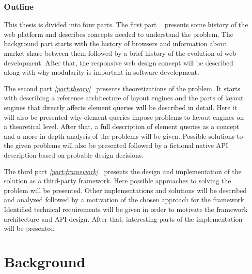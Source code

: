\documentclass[a4paper,11pt]{kth-mag}
\begin{document}
    \section{Outline}
      This thesis is divided into four parts. The first part \emph{\ref{part:background}~} presents some history of the \gls{web} platform and describes concepts needed to understand the problem.
      The background part starts with the history of \glspl{browser} and information about market share between them followed by a brief history of the evolution of \gls{web} development.
      After that, the \gls{responsive} \gls{web} design concept will be described along with why modularity is important in software development.

      The second part \emph{\ref{part:theory}~} presents theoretizations of the problem.
      It starts with describing a reference architecture of \glspl{layout engine} and the parts of \glspl{layout engine} that directly affects element queries will be described in detail.
      Here it will also be presented why element queries impose problems to \glspl{layout engine} on a theoretical level.
      After that, a full description of element queries as a concept and a more in depth analysis of the problems will be given.
      Possible solutions to the given problems will also be presented followed by a fictional native \gls{API} description based on probable design decisions.

      The third part \emph{\ref{part:framework}~} presents the design and implementation of the solution as a \gls{third-party} framework.
      Here possible approaches to solving the problem will be presented.
      Other implementations and solutions will be described and analyzed followed by a motivation of the chosen approach for the framework.
      Identified technical requirements will be given in order to motivate the framework architecture and \gls{API} design.
      After that, interesting parts of the implementation will be presented.

  \part{Background}\label{part:background}
\end{document}
